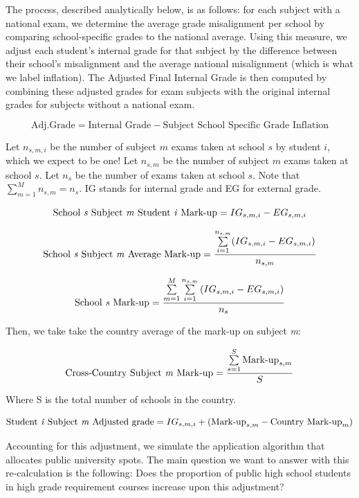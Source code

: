 \documentclass{article}
\begin{document}
The process, described analytically below, is as follows: for each subject with a national exam, we determine the average grade misalignment per school by comparing school-specific grades to the national average. Using this measure, we adjust each student’s internal grade for that subject by the difference between their school's misalignment and the average national misalignment (which is what we label inflation). The Adjusted Final Internal Grade is then computed by combining these adjusted grades for exam subjects with the original internal grades for subjects without a national exam.

\[
\text{Adj.Grade} = \text{Internal Grade} - \text{Subject School Specific Grade Inflation}
\]  

Let $n_{s,m,i}$ be the number of subject $m$ exams taken at school $s$ by student $i$, which we expect to be one! 
Let $n_{s,m}$ be the number of subject $m$ exams taken at school $s$.
Let $n_{s}$ be the number of exams taken at school $s$.
Note that $\sum^{M}_{m=1} n_{s,m} = n_s$. IG stands for internal grade and EG for external grade.


\[
\text{School \textit{s} Subject \textit{m} Student \textit{i} Mark-up} = IG_{s,m,i}-EG_{s,m,i}
\]

\[
\text{School \textit{s} Subject \textit{m} Average Mark-up} = \frac{\sum\limits_{i=1}^{n_{s,m}} (IG_{s,m,i}-EG_{s,m,i})}{n_{s,m}} 
\]


\[
\text{School \textit{s} Mark-up} = \frac{\sum\limits_{m=1}^{M} \sum\limits_{i=1}^{n_{s,m}} \left( IG_{s,m,i} - EG_{s,m,i} \right)}{n_{s}}
\]



Then, we take take the country average of the mark-up on subject \textit{m}:

\[
\text{Cross-Country Subject \textit{m} Mark-up} = \frac{\sum\limits_{s=1}^{S} \text{Mark-up}_{s,m}}{S}
\]

Where S is the total number of schools in the country. %

\[
\text{Student \textit{i} Subject \textit{m} Adjusted grade} = IG_{s,m,i} + (\text{Mark-up}_{s,m} - \text{Country Mark-up}_{m} )
\]

Accounting for this adjustment, we simulate the application algorithm that allocates public university spots.
The main question we want to answer with this re-calculation is the following: Does the proportion of public high school students in high grade requirement courses increase upon this adjustment?
\end{document}
